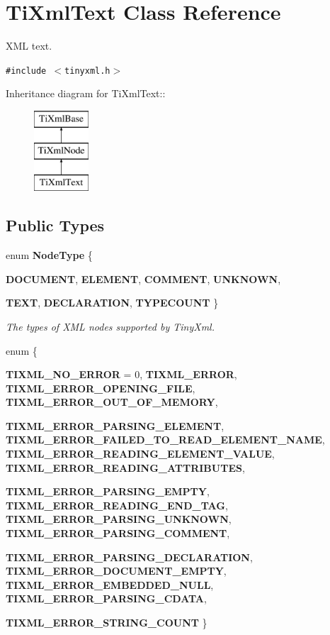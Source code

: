 \section{Ti\-Xml\-Text Class Reference}
\label{classTiXmlText}
XML text.  


{\tt \#include $<$tinyxml.h$>$}

Inheritance diagram for Ti\-Xml\-Text::\begin{figure}[H]
\begin{center}
\leavevmode
\includegraphics[height=3cm]{classTiXmlText}
\end{center}
\end{figure}
\subsection*{Public Types}
\begin{CompactItemize}
\item 
enum {\bf Node\-Type} \{ \par
{\bf DOCUMENT}, 
{\bf ELEMENT}, 
{\bf COMMENT}, 
{\bf UNKNOWN}, 
\par
{\bf TEXT}, 
{\bf DECLARATION}, 
{\bf TYPECOUNT}
 \}
\begin{CompactList}\small\item\em The types of XML nodes supported by Tiny\-Xml. \item\end{CompactList}\item 
enum \{ \par
{\bf TIXML\_\-NO\_\-ERROR} =  0, 
{\bf TIXML\_\-ERROR}, 
{\bf TIXML\_\-ERROR\_\-OPENING\_\-FILE}, 
{\bf TIXML\_\-ERROR\_\-OUT\_\-OF\_\-MEMORY}, 
\par
{\bf TIXML\_\-ERROR\_\-PARSING\_\-ELEMENT}, 
{\bf TIXML\_\-ERROR\_\-FAILED\_\-TO\_\-READ\_\-ELEMENT\_\-NAME}, 
{\bf TIXML\_\-ERROR\_\-READING\_\-ELEMENT\_\-VALUE}, 
{\bf TIXML\_\-ERROR\_\-READING\_\-ATTRIBUTES}, 
\par
{\bf TIXML\_\-ERROR\_\-PARSING\_\-EMPTY}, 
{\bf TIXML\_\-ERROR\_\-READING\_\-END\_\-TAG}, 
{\bf TIXML\_\-ERROR\_\-PARSING\_\-UNKNOWN}, 
{\bf TIXML\_\-ERROR\_\-PARSING\_\-COMMENT}, 
\par
{\bf TIXML\_\-ERROR\_\-PARSING\_\-DECLARATION}, 
{\bf TIXML\_\-ERROR\_\-DOCUMENT\_\-EMPTY}, 
{\bf TIXML\_\-ERROR\_\-EMBEDDED\_\-NULL}, 
{\bf TIXML\_\-ERROR\_\-PARSING\_\-CDATA}, 
\par
{\bf TIXML\_\-ERROR\_\-STRING\_\-COUNT}
 \}
\end{CompactItemize}
